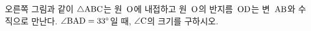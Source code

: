 \noindent\begin{minipage}[t]{0.58\linewidth}\vspace{0pt}\raggedright 오른쪽 그림과 같이 $\triangle\mathrm{ABC}$는 원~$\mathrm{O}$에 내접하고 원~$\mathrm{O}$의 반지름~$\mathrm{OD}$는 변~$\mathrm{AB}$와 수직으로 만난다. $\angle\mathrm{BAD}=33^\circ$일 때, $\angle\mathrm{C}$의 크기를 구하시오.\end{minipage}\hfill\begin{minipage}[t]{0.4\linewidth}\vspace{0pt}\centering \resizebox{\ifdim\width>\linewidth\linewidth\else\width\fi}{!}{}\end{minipage}\par

